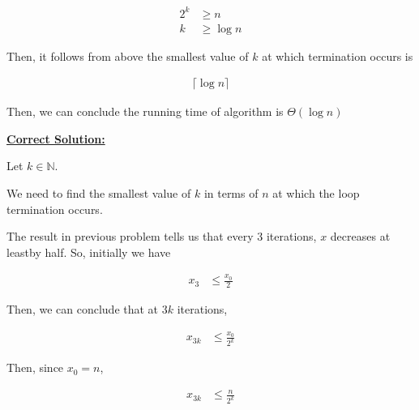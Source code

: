 \documentclass[12pt]{article}
\begin{document}
\begin{enumerate}[a.]
    \begin{align}
        2^k &\geq n\\
        k &\geq \log n
    \end{align}

    \bigskip

    Then, it follows from above the smallest value of $k$ at which termination occurs
    is

    \begin{align}
        \lceil \log n \rceil
    \end{align}

    \bigskip

    Then, we can conclude the running time of algorithm is $\Theta (\log n)$

    \bigskip

    \begin{mdframed}
        \underline{\textbf{Correct Solution:}}

        \bigskip

        Let $k \in \mathbb{N}$.

        \bigskip

        We need to find the smallest value of $k$ in terms of $n$ at which the loop
        termination occurs.

        \bigskip

        The result in previous problem tells us that every 3 iterations, $x$ decreases
        \color{red}at least\color{black}\:by half. So, initially we have

        \setcounter{equation}{0}
        \begin{align}
            x_3 &\leq \frac{x_0}{2}
        \end{align}

        \bigskip

        Then, we can conclude that at $3k$ iterations,

        \begin{align}
            x_{3k} &\leq \frac{x_0}{2^k}
        \end{align}

        \bigskip

        Then, since $x_0 = n$,

        \color{red}
        \begin{align}
            x_{3k} &\leq \frac{n}{2^k}
        \end{align}
        \color{black}

        \bigskip


\end{mdframed}
\end{enumerate}
\end{document}
